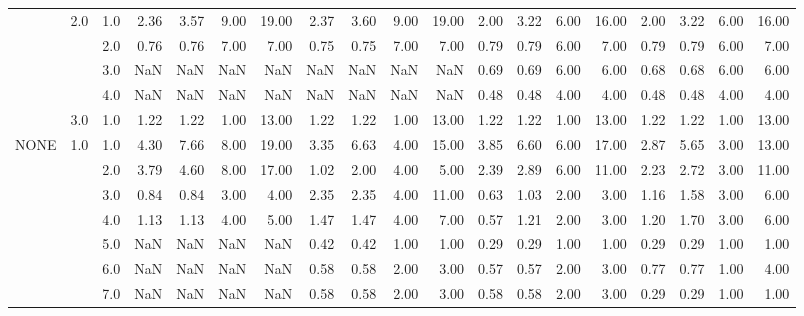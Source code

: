 \begin{tabular}{lllrrrrrrrrrrrrrrrr}
     & 2.0 & 1.0  &       2.36 &      3.57 &  9.00 &  19.00 &       2.37 &      3.60 & 9.00 &  19.00 &       2.00 &      3.22 & 6.00 &  16.00 &       2.00 &      3.22 & 6.00 &  16.00 \\
     &     & 2.0  &       0.76 &      0.76 &  7.00 &   7.00 &       0.75 &      0.75 & 7.00 &   7.00 &       0.79 &      0.79 & 6.00 &   7.00 &       0.79 &      0.79 & 6.00 &   7.00 \\
     &     & 3.0  &        NaN &       NaN &   NaN &    NaN &        NaN &       NaN &  NaN &    NaN &       0.69 &      0.69 & 6.00 &   6.00 &       0.68 &      0.68 & 6.00 &   6.00 \\
     &     & 4.0  &        NaN &       NaN &   NaN &    NaN &        NaN &       NaN &  NaN &    NaN &       0.48 &      0.48 & 4.00 &   4.00 &       0.48 &      0.48 & 4.00 &   4.00 \\
     & 3.0 & 1.0  &       1.22 &      1.22 &  1.00 &  13.00 &       1.22 &      1.22 & 1.00 &  13.00 &       1.22 &      1.22 & 1.00 &  13.00 &       1.22 &      1.22 & 1.00 &  13.00 \\
NONE & 1.0 & 1.0  &       4.30 &      7.66 &  8.00 &  19.00 &       3.35 &      6.63 & 4.00 &  15.00 &       3.85 &      6.60 & 6.00 &  17.00 &       2.87 &      5.65 & 3.00 &  13.00 \\
     &     & 2.0  &       3.79 &      4.60 &  8.00 &  17.00 &       1.02 &      2.00 & 4.00 &   5.00 &       2.39 &      2.89 & 6.00 &  11.00 &       2.23 &      2.72 & 3.00 &  11.00 \\
     &     & 3.0  &       0.84 &      0.84 &  3.00 &   4.00 &       2.35 &      2.35 & 4.00 &  11.00 &       0.63 &      1.03 & 2.00 &   3.00 &       1.16 &      1.58 & 3.00 &   6.00 \\
     &     & 4.0  &       1.13 &      1.13 &  4.00 &   5.00 &       1.47 &      1.47 & 4.00 &   7.00 &       0.57 &      1.21 & 2.00 &   3.00 &       1.20 &      1.70 & 3.00 &   6.00 \\
     &     & 5.0  &        NaN &       NaN &   NaN &    NaN &       0.42 &      0.42 & 1.00 &   1.00 &       0.29 &      0.29 & 1.00 &   1.00 &       0.29 &      0.29 & 1.00 &   1.00 \\
     &     & 6.0  &        NaN &       NaN &   NaN &    NaN &       0.58 &      0.58 & 2.00 &   3.00 &       0.57 &      0.57 & 2.00 &   3.00 &       0.77 &      0.77 & 1.00 &   4.00 \\
     &     & 7.0  &        NaN &       NaN &   NaN &    NaN &       0.58 &      0.58 & 2.00 &   3.00 &       0.58 &      0.58 & 2.00 &   3.00 &       0.29 &      0.29 & 1.00 &   1.00 \\

\end{tabular}
